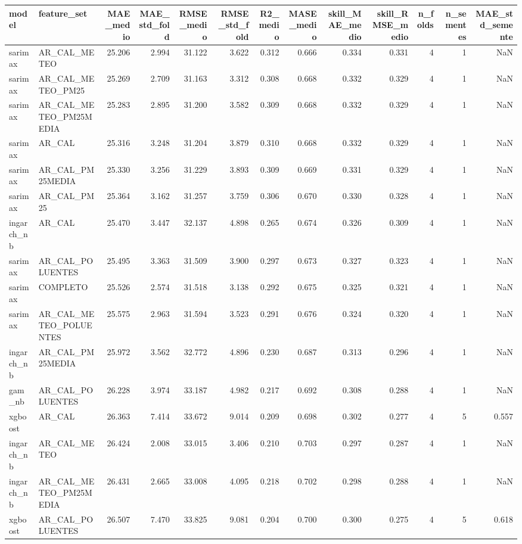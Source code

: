 \begin{tabular}{llrrrrrrrrrrr}
\toprule
model & feature_set & MAE_medio & MAE_std_fold & RMSE_medio & RMSE_std_fold & R2_medio & MASE_medio & skill_MAE_medio & skill_RMSE_medio & n_folds & n_sementes & MAE_std_semente \\
\midrule
sarimax & AR_CAL_METEO & 25.206 & 2.994 & 31.122 & 3.622 & 0.312 & 0.666 & 0.334 & 0.331 & 4 & 1 & NaN \\
sarimax & AR_CAL_METEO_PM25 & 25.269 & 2.709 & 31.163 & 3.312 & 0.308 & 0.668 & 0.332 & 0.329 & 4 & 1 & NaN \\
sarimax & AR_CAL_METEO_PM25MEDIA & 25.283 & 2.895 & 31.200 & 3.582 & 0.309 & 0.668 & 0.332 & 0.329 & 4 & 1 & NaN \\
sarimax & AR_CAL & 25.316 & 3.248 & 31.204 & 3.879 & 0.310 & 0.668 & 0.332 & 0.329 & 4 & 1 & NaN \\
sarimax & AR_CAL_PM25MEDIA & 25.330 & 3.256 & 31.229 & 3.893 & 0.309 & 0.669 & 0.331 & 0.329 & 4 & 1 & NaN \\
sarimax & AR_CAL_PM25 & 25.364 & 3.162 & 31.257 & 3.759 & 0.306 & 0.670 & 0.330 & 0.328 & 4 & 1 & NaN \\
ingarch_nb & AR_CAL & 25.470 & 3.447 & 32.137 & 4.898 & 0.265 & 0.674 & 0.326 & 0.309 & 4 & 1 & NaN \\
sarimax & AR_CAL_POLUENTES & 25.495 & 3.363 & 31.509 & 3.900 & 0.297 & 0.673 & 0.327 & 0.323 & 4 & 1 & NaN \\
sarimax & COMPLETO & 25.526 & 2.574 & 31.518 & 3.138 & 0.292 & 0.675 & 0.325 & 0.321 & 4 & 1 & NaN \\
sarimax & AR_CAL_METEO_POLUENTES & 25.575 & 2.963 & 31.594 & 3.523 & 0.291 & 0.676 & 0.324 & 0.320 & 4 & 1 & NaN \\
ingarch_nb & AR_CAL_PM25MEDIA & 25.972 & 3.562 & 32.772 & 4.896 & 0.230 & 0.687 & 0.313 & 0.296 & 4 & 1 & NaN \\
gam_nb & AR_CAL_POLUENTES & 26.228 & 3.974 & 33.187 & 4.982 & 0.217 & 0.692 & 0.308 & 0.288 & 4 & 1 & NaN \\
xgboost & AR_CAL & 26.363 & 7.414 & 33.672 & 9.014 & 0.209 & 0.698 & 0.302 & 0.277 & 4 & 5 & 0.557 \\
ingarch_nb & AR_CAL_METEO & 26.424 & 2.008 & 33.015 & 3.406 & 0.210 & 0.703 & 0.297 & 0.287 & 4 & 1 & NaN \\
ingarch_nb & AR_CAL_METEO_PM25MEDIA & 26.431 & 2.665 & 33.008 & 4.095 & 0.218 & 0.702 & 0.298 & 0.288 & 4 & 1 & NaN \\
xgboost & AR_CAL_POLUENTES & 26.507 & 7.470 & 33.825 & 9.081 & 0.204 & 0.700 & 0.300 & 0.275 & 4 & 5 & 0.618 \\

\end{tabular}

